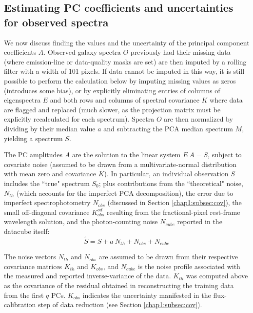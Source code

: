 \subsection{Estimating PC coefficients and uncertainties for observed spectra}
\label{chap1:subsec:PC_unc}

We now discuss finding the values and the uncertainty of the principal component coefficients $A$. Observed galaxy spectra $O$ previously had their missing data (where emission-line or data-quality masks are set) are then imputed by a rolling filter with a width of 101 pixels. If data cannot be imputed in this way, it is still possible to perform the calculation below by imputing missing values as zeros (introduces some bias), or by explicitly eliminating entries of columns of eigenspectra $E$ and both rows and columns of spectral covariance $K$ where data are flagged and replaced (much slower, as the projection matrix must be explicitly recalculated for each spectrum). Spectra $O$ are then normalized by dividing by their median value $a$ and subtracting the PCA median spectrum $M$, yielding a spectrum $S$.

The PC amplitudes $A$ are the solution to the linear system $E ~ A = S$, subject to covariate noise (assumed to be drawn from a multivariate-normal distribution with mean zero and covariance $K$). In particular, an individual observation $S$ includes the ``true" spectrum $S_0$; plus contributions from the ``theoretical" noise, $N_{th}$ (which accounts for the imperfect PCA decomposition), the error due to imperfect spectrophotometry $N_{obs}$ (discussed in Section \ref{chap1:subsec:cov}), the small off-diagonal covariance $K_{obs}^{od}$ resulting from the fractional-pixel rest-frame wavelength solution, and the photon-counting noise $N_{cube}$ reported in the datacube itself:
%
\begin{equation}
    \widetilde{S} = S + a ~ N_{th} + N_{obs} + N_{cube}
\end{equation}

The noise vectors $N_{th}$ and $N_{obs}$ are assumed to be drawn from their respective covariance matrices $K_{th}$ and $K_{obs}$, and $N_{cube}$ is the noise profile associated with the measured and reported inverse-variance of the data. $K_{th}$ was computed above as the covariance of the residual obtained in reconstructing the training data from the first $q$ PCs. $K_{obs}$ indicates the uncertainty manifested in the flux-calibration step of data reduction (see Section \ref{chap1:subsec:cov}).

